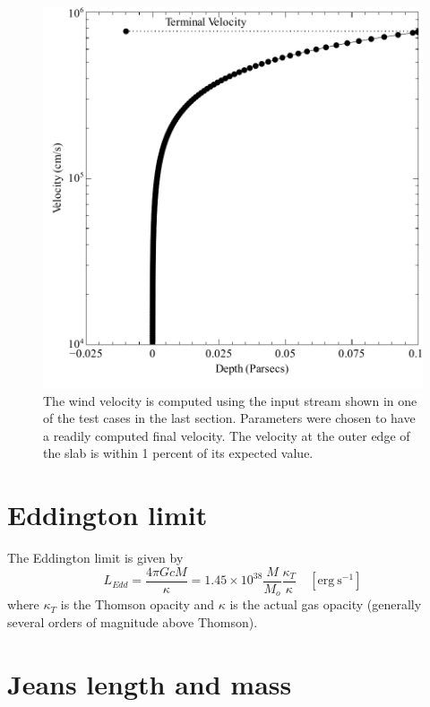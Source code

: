 \begin{figure}
\centering
\includegraphics[scale=0.75]{WindVelocityvsDepth}
\caption[Wind velocity vs depth]
{The wind velocity is computed using the input stream shown in
one of the test cases in the last section.  Parameters were chosen to have
a readily computed final velocity.  The velocity at the outer edge of the
slab is within 1 percent of its expected value.}
\label{fig:WindVelocityvsDepth}
\end{figure}

\section{Eddington limit}

The Eddington limit is given by
\begin{equation}
{L_{Edd}} = \frac{{4\pi GcM}}{\kappa } = 1.45 \times
{10^{38}}\frac{M}{{{M_o}}}\frac{{{\kappa _T}}}{\kappa }
\quad [\mathrm{erg~s}^{-1}]
\end{equation}
where $\kappa_T$ is the Thomson opacity and $\kappa$ is the actual gas opacity (generally
several orders of magnitude above Thomson).

\section{Jeans length and mass}

